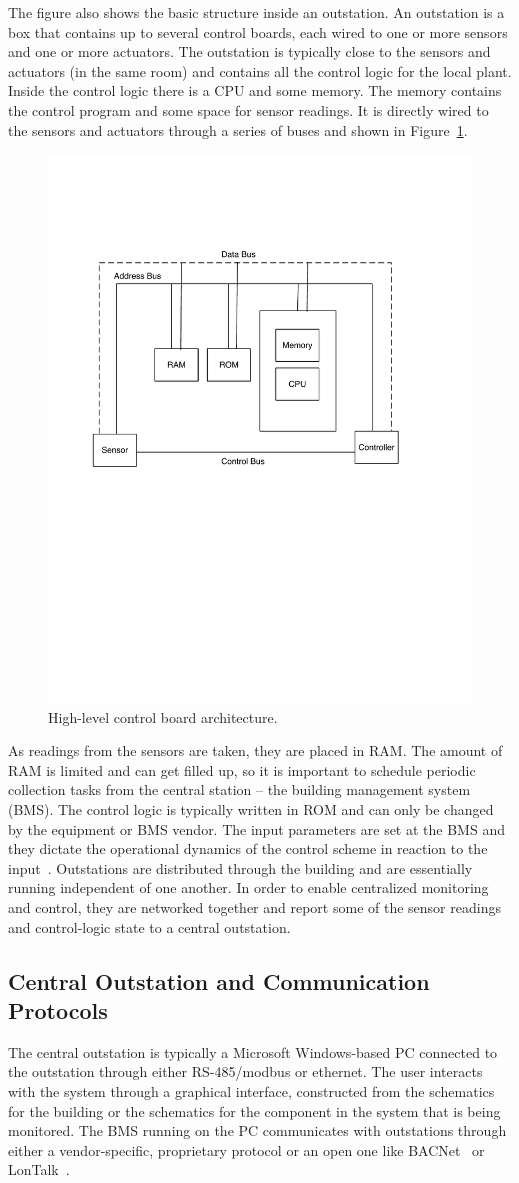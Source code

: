 The figure also shows the basic structure inside an outstation.  An outstation is a box that contains up to several control boards, each
wired to one or more sensors and one or more actuators.  The outstation is typically close to the sensors and actuators (in the same room)
and contains all the control logic for the local plant.  Inside the control logic there is a CPU and some memory.  The memory
contains the control program and some space for sensor readings.  It is directly wired to the sensors and actuators through
a series of buses and shown in Figure~\ref{fig:control_box}.

\begin{figure}[t!] %
\centering
\includegraphics[width=0.50\columnwidth]{figs/control_box}
\caption{High-level control board architecture.}
\label{fig:control_box}
\end{figure}

As readings from the sensors are taken, they are placed in RAM.  The amount of RAM is limited and can get filled up, so it is important
to schedule periodic collection tasks from the central station -- the building management system (BMS).  The control logic is typically
written in ROM and can only be changed by the equipment or BMS vendor.  The input parameters are set at the BMS and they dictate the operational dynamics
of the control scheme in reaction to the input~\cite{BMS_book}.
Outstations are distributed through the building and are essentially running independent of one another.  In order to enable centralized 
monitoring and control, they are networked together and report some of the sensor readings and control-logic state to a central outstation.

\subsection{Central Outstation and Communication Protocols}
The central outstation is typically a Microsoft Windows-based PC connected to the outstation through either RS-485/modbus or ethernet.
The user interacts with the system through a graphical interface, constructed from the schematics for the building or the schematics
for the component in the system that is being monitored.  The BMS running on the PC communicates with outstations through either a 
vendor-specific, proprietary protocol or an open one like BACNet~\cite{Bacnet} or LonTalk~\cite{LonTalk}.

